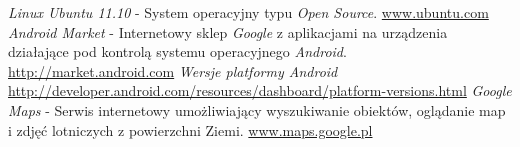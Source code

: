 \begin{thebibliography}{99}
	\emph{Linux Ubuntu 11.10} - System operacyjny typu \emph{Open Source}.
	 \url{www.ubuntu.com}
	\emph{Android Market} - Internetowy sklep \emph{Google} z aplikacjami na urządzenia działające pod kontrolą systemu operacyjnego \emph{Android}.
	\url{http://market.android.com}	
	\emph{Wersje platformy Android}\\
	\url{http://developer.android.com/resources/dashboard/platform-versions.html}	
	\emph{Google Maps} - Serwis internetowy umożliwiający wyszukiwanie obiektów, oglądanie map i zdjęć lotniczych z powierzchni Ziemi.
	\url{www.maps.google.pl}

\end{thebibliography}



